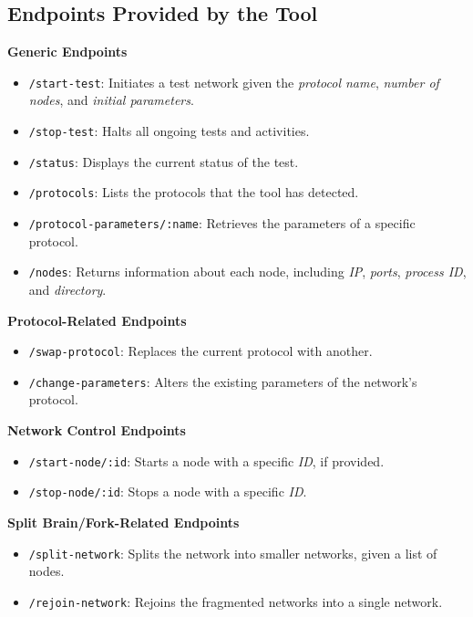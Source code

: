 \subsection*{\textbf{Endpoints Provided by the Tool}}

\textbf{Generic Endpoints}
\begin{itemize}
  \item \texttt{/start-test}: Initiates a test network given the \textit{protocol name}, \textit{number of nodes}, and \textit{initial parameters}.
  \item \texttt{/stop-test}: Halts all ongoing tests and activities.
  \item \texttt{/status}: Displays the current status of the test.
  \item \texttt{/protocols}: Lists the protocols that the tool has detected.
  \item \texttt{/protocol-parameters/:name}: Retrieves the parameters of a specific protocol.
  \item \texttt{/nodes}: Returns information about each node, including \textit{IP}, \textit{ports}, \textit{process ID}, and \textit{directory}.
\end{itemize}

\textbf{Protocol-Related Endpoints}
\begin{itemize}
  \item \texttt{/swap-protocol}: Replaces the current protocol with another.
  \item \texttt{/change-parameters}: Alters the existing parameters of the network's protocol.
\end{itemize}

\textbf{Network Control Endpoints}
\begin{itemize}
  \item \texttt{/start-node/:id}: Starts a node with a specific \textit{ID}, if provided.
  \item \texttt{/stop-node/:id}: Stops a node with a specific \textit{ID}.
\end{itemize}

\textbf{Split Brain/Fork-Related Endpoints}
\begin{itemize}
  \item \texttt{/split-network}: Splits the network into smaller networks, given a list of nodes.
  \item \texttt{/rejoin-network}: Rejoins the fragmented networks into a single network.
\end{itemize}

